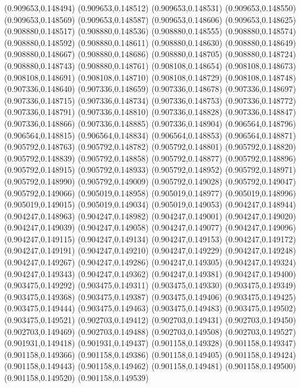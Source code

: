 (0.909653,0.148494)
(0.909653,0.148512)
(0.909653,0.148531)
(0.909653,0.148550)
(0.909653,0.148569)
(0.909653,0.148587)
(0.909653,0.148606)
(0.909653,0.148625)
(0.908880,0.148517)
(0.908880,0.148536)
(0.908880,0.148555)
(0.908880,0.148574)
(0.908880,0.148592)
(0.908880,0.148611)
(0.908880,0.148630)
(0.908880,0.148649)
(0.908880,0.148667)
(0.908880,0.148686)
(0.908880,0.148705)
(0.908880,0.148724)
(0.908880,0.148743)
(0.908880,0.148761)
(0.908108,0.148654)
(0.908108,0.148673)
(0.908108,0.148691)
(0.908108,0.148710)
(0.908108,0.148729)
(0.908108,0.148748)
(0.907336,0.148640)
(0.907336,0.148659)
(0.907336,0.148678)
(0.907336,0.148697)
(0.907336,0.148715)
(0.907336,0.148734)
(0.907336,0.148753)
(0.907336,0.148772)
(0.907336,0.148791)
(0.907336,0.148810)
(0.907336,0.148828)
(0.907336,0.148847)
(0.907336,0.148866)
(0.907336,0.148885)
(0.907336,0.148904)
(0.906564,0.148796)
(0.906564,0.148815)
(0.906564,0.148834)
(0.906564,0.148853)
(0.906564,0.148871)
(0.905792,0.148763)
(0.905792,0.148782)
(0.905792,0.148801)
(0.905792,0.148820)
(0.905792,0.148839)
(0.905792,0.148858)
(0.905792,0.148877)
(0.905792,0.148896)
(0.905792,0.148915)
(0.905792,0.148933)
(0.905792,0.148952)
(0.905792,0.148971)
(0.905792,0.148990)
(0.905792,0.149009)
(0.905792,0.149028)
(0.905792,0.149047)
(0.905792,0.149066)
(0.905019,0.148958)
(0.905019,0.148977)
(0.905019,0.148996)
(0.905019,0.149015)
(0.905019,0.149034)
(0.905019,0.149053)
(0.904247,0.148944)
(0.904247,0.148963)
(0.904247,0.148982)
(0.904247,0.149001)
(0.904247,0.149020)
(0.904247,0.149039)
(0.904247,0.149058)
(0.904247,0.149077)
(0.904247,0.149096)
(0.904247,0.149115)
(0.904247,0.149134)
(0.904247,0.149153)
(0.904247,0.149172)
(0.904247,0.149191)
(0.904247,0.149210)
(0.904247,0.149229)
(0.904247,0.149248)
(0.904247,0.149267)
(0.904247,0.149286)
(0.904247,0.149305)
(0.904247,0.149324)
(0.904247,0.149343)
(0.904247,0.149362)
(0.904247,0.149381)
(0.904247,0.149400)
(0.903475,0.149292)
(0.903475,0.149311)
(0.903475,0.149330)
(0.903475,0.149349)
(0.903475,0.149368)
(0.903475,0.149387)
(0.903475,0.149406)
(0.903475,0.149425)
(0.903475,0.149444)
(0.903475,0.149463)
(0.903475,0.149483)
(0.903475,0.149502)
(0.903475,0.149521)
(0.902703,0.149412)
(0.902703,0.149431)
(0.902703,0.149450)
(0.902703,0.149469)
(0.902703,0.149488)
(0.902703,0.149508)
(0.902703,0.149527)
(0.901931,0.149418)
(0.901931,0.149437)
(0.901158,0.149328)
(0.901158,0.149347)
(0.901158,0.149366)
(0.901158,0.149386)
(0.901158,0.149405)
(0.901158,0.149424)
(0.901158,0.149443)
(0.901158,0.149462)
(0.901158,0.149481)
(0.901158,0.149500)
(0.901158,0.149520)
(0.901158,0.149539)
